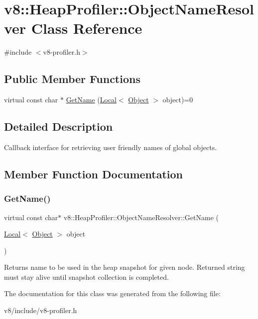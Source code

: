 \hypertarget{classv8_1_1HeapProfiler_1_1ObjectNameResolver}{}\section{v8\+:\+:Heap\+Profiler\+:\+:Object\+Name\+Resolver Class Reference}
\label{classv8_1_1HeapProfiler_1_1ObjectNameResolver}


{\ttfamily \#include $<$v8-\/profiler.\+h$>$}

\subsection*{Public Member Functions}
\begin{DoxyCompactItemize}
\item 
virtual const char $\ast$ \mbox{\hyperlink{classv8_1_1HeapProfiler_1_1ObjectNameResolver_aa9ac9e83806c7c746b652f435cf66622}{Get\+Name}} (\mbox{\hyperlink{classv8_1_1Local}{Local}}$<$ \mbox{\hyperlink{classv8_1_1Object}{Object}} $>$ object)=0
\end{DoxyCompactItemize}


\subsection{Detailed Description}
Callback interface for retrieving user friendly names of global objects. 

\subsection{Member Function Documentation}
\mbox{\label{classv8_1_1HeapProfiler_1_1ObjectNameResolver_aa9ac9e83806c7c746b652f435cf66622}} 
\subsubsection{\texorpdfstring{Get\+Name()}{GetName()}}
{\footnotesize\ttfamily virtual const char$\ast$ v8\+::\+Heap\+Profiler\+::\+Object\+Name\+Resolver\+::\+Get\+Name (\begin{DoxyParamCaption}\item[{\mbox{\hyperlink{classv8_1_1Local}{Local}}$<$ \mbox{\hyperlink{classv8_1_1Object}{Object}} $>$}]{object }\end{DoxyParamCaption})\hspace{0.3cm}{\ttfamily [pure virtual]}}

Returns name to be used in the heap snapshot for given node. Returned string must stay alive until snapshot collection is completed. 

The documentation for this class was generated from the following file\+:\begin{DoxyCompactItemize}
\item 
v8/include/v8-\/profiler.\+h\end{DoxyCompactItemize}
